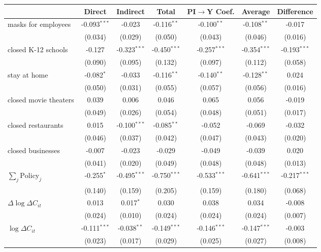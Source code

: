 
\begin{tabular}{lccccc|>{}c}
\toprule
  & Direct & Indirect & Total & PI$\to$Y Coef. & Average & Difference\\
\midrule
masks for employees & -0.093$^{***}$ & -0.023 & -0.116$^{**}$ & -0.100$^{**}$ & -0.108$^{**}$ & -0.017\\
 & (0.034) & (0.029) & (0.050) & (0.043) & (0.046) & (0.016)\\
closed K-12 schools & -0.127 & -0.323$^{***}$ & -0.450$^{***}$ & -0.257$^{***}$ & -0.354$^{***}$ & -0.193$^{***}$\\
 & (0.090) & (0.095) & (0.132) & (0.097) & (0.112) & (0.058)\\
stay at home & -0.082$^{*}$ & -0.033 & -0.116$^{**}$ & -0.140$^{**}$ & -0.128$^{**}$ & 0.024\\
 & (0.050) & (0.031) & (0.055) & (0.057) & (0.056) & (0.016)\\
closed movie theaters & 0.039 & 0.006 & 0.046 & 0.065 & 0.056 & -0.019\\
 & (0.049) & (0.026) & (0.054) & (0.048) & (0.051) & (0.017)\\
closed restaurants & 0.015 & -0.100$^{***}$ & -0.085$^{**}$ & -0.052 & -0.069 & -0.032\\
 & (0.046) & (0.037) & (0.042) & (0.047) & (0.043) & (0.020)\\
closed businesses & -0.007 & -0.023 & -0.029 & -0.049 & -0.039 & 0.020\\
 & (0.041) & (0.020) & (0.049) & (0.048) & (0.048) & (0.013)\\
$\sum_j \mathrm{Policy}_j$ & -0.255$^{*}$ & -0.495$^{***}$ & -0.750$^{***}$ & -0.533$^{***}$ & -0.641$^{***}$ & -0.217$^{***}$\\
 & (0.140) & (0.159) & (0.205) & (0.159) & (0.180) & (0.068)\\
$\Delta \log \Delta C_{it}$ & 0.013 & 0.017$^{*}$ & 0.030 & 0.038 & 0.034 & -0.008\\
 & (0.024) & (0.010) & (0.024) & (0.024) & (0.024) & (0.007)\\
$\log \Delta C_{it}$ & -0.111$^{***}$ & -0.038$^{**}$ & -0.149$^{***}$ & -0.146$^{***}$ & -0.147$^{***}$ & -0.003\\
 & (0.023) & (0.017) & (0.029) & (0.025) & (0.027) & (0.008)\\
\bottomrule
\end{tabular}